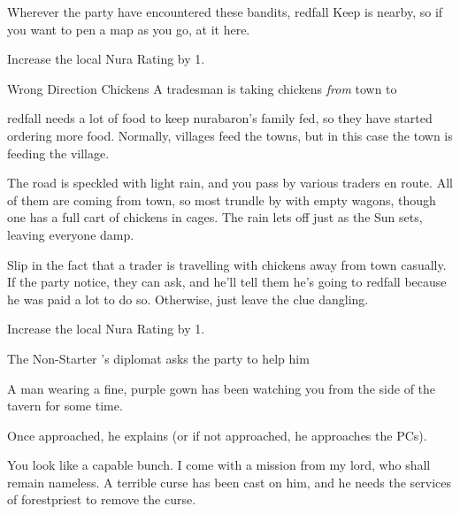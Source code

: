 \begin{multicols}{2}
Wherever the party have encountered these bandits, \gls{redfall} Keep is nearby, so if you want to pen a map as you go, at it here.

Increase the local Nura Rating by 1.

{\N Wrong Direction Chickens}%
{A tradesman is taking chickens \emph{from} town to }%

\Gls{redfall} needs a lot of food to keep \gls{nurabaron}'s family fed, so they have started ordering more food.
Normally, villages feed the towns, but in this case the town is feeding the village.

\begin{boxtext}

	The road is speckled with light rain, and you pass by various traders en route.
	All of them are coming from town, so most trundle by with empty wagons, though one has a full cart of chickens in cages.
	The rain lets off just as the Sun sets, leaving everyone damp.

\end{boxtext}

Slip in the fact that a trader is travelling with chickens away from town casually.
If the party notice, they can ask, and he'll tell them he's going to \gls{redfall} because he was paid a lot to do so.
Otherwise, just leave the clue dangling.

Increase the local Nura Rating by 1.

\resumecontents[Town]

{The Non-Starter}%
{'s diplomat asks the party to help him}%
\label{nonstarter}

\stopcontents[Town]

\begin{boxtext}

	A man wearing a fine, purple gown has been watching you from the side of the tavern for some time.

\end{boxtext}

Once approached, he explains (or if not approached, he approaches the PCs).

\begin{speechtext}

	You look like a capable bunch.
	I come with a mission from my lord, who shall remain nameless.
	A terrible curse has been cast on him, and he needs the services of \gls{forestpriest} to remove the curse.


\end{speechtext}
\end{multicols}
